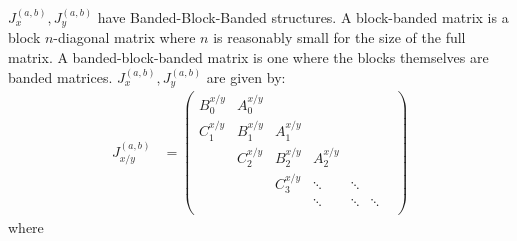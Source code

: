 \documentclass[11pt, oneside]{article}   	%
\begin{document}
$J_x^{(a,b)}, J_y^{(a,b)}$ have Banded-Block-Banded structures. A block-banded matrix is a block $n$-diagonal matrix where $n$ is reasonably small for the size of the full matrix. A banded-block-banded matrix is one where the blocks themselves are banded matrices. $J_x^{(a,b)}, J_y^{(a,b)}$ are given by:
\begin{align}
J_{x/y}^{(a,b)} &= \begin{pmatrix}
		B^{x/y}_0 & A^{x/y}_0 & & & & \\
		C^{x/y}_1 & B^{x/y}_1 & A^{x/y}_1 & & & \\
		& C^{x/y}_2 & B^{x/y}_2 & A^{x/y}_2  & & & \\
		& & C^{x/y}_3 & \ddots & \ddots & \\
		& & & \ddots & \ddots & \ddots \\
	\end{pmatrix}
\end{align}
where
\end{document}
